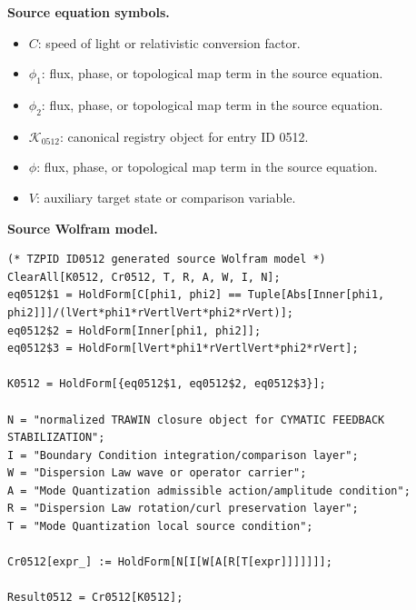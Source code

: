 \begin{minipage}[t]{0.49\linewidth}
\begingroup
\small
\raggedright
\textbf{Source equation symbols.}\par
\begin{itemize}[leftmargin=1.35em,itemsep=1pt,topsep=1pt,parsep=0pt]
    \item $C$: speed of light or relativistic conversion factor.
    \item $\phi_1$: flux, phase, or topological map term in the source equation.
    \item $\phi_2$: flux, phase, or topological map term in the source equation.
    \item $\mathcal{K}_{0512}$: canonical registry object for entry ID 0512.
    \item $\phi$: flux, phase, or topological map term in the source equation.
    \item $V$: auxiliary target state or comparison variable.
\end{itemize}
\endgroup
\end{minipage}\hfill
\begin{minipage}[t]{0.47\linewidth}
\begingroup
\scriptsize
\raggedright
\textbf{Source Wolfram model.}\par
\begin{Verbatim}[fontsize=\tiny,breaklines=true,breakanywhere=true]
(* TZPID ID0512 generated source Wolfram model *)
ClearAll[K0512, Cr0512, T, R, A, W, I, N];
eq0512$1 = HoldForm[C[phi1, phi2] == Tuple[Abs[Inner[phi1, phi2]]]/(lVert*phi1*rVertlVert*phi2*rVert)];
eq0512$2 = HoldForm[Inner[phi1, phi2]];
eq0512$3 = HoldForm[lVert*phi1*rVertlVert*phi2*rVert];

K0512 = HoldForm[{eq0512$1, eq0512$2, eq0512$3}];

N = "normalized TRAWIN closure object for CYMATIC FEEDBACK STABILIZATION";
I = "Boundary Condition integration/comparison layer";
W = "Dispersion Law wave or operator carrier";
A = "Mode Quantization admissible action/amplitude condition";
R = "Dispersion Law rotation/curl preservation layer";
T = "Mode Quantization local source condition";

Cr0512[expr_] := HoldForm[N[I[W[A[R[T[expr]]]]]]];

Result0512 = Cr0512[K0512];
\end{Verbatim}
\endgroup
\end{minipage}

